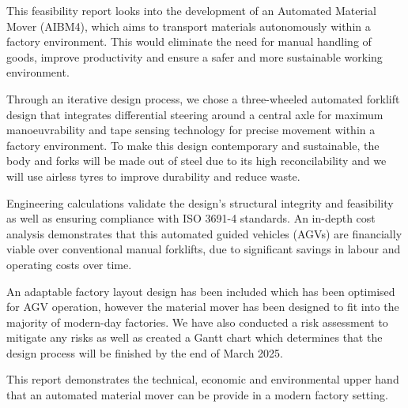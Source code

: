 \documentclass[12pt,titlepage]{article}
\begin{document}
This feasibility report looks into the development of an Automated Material Mover (AIBM4), which aims to transport materials autonomously within a factory environment. This would eliminate the need for manual handling of goods, improve productivity and ensure a safer and more sustainable working environment. 
\par Through an iterative design process, we chose a three-wheeled automated forklift design that integrates differential steering around a central axle for maximum manoeuvrability and tape sensing technology for precise movement within a factory environment. To make this design contemporary and sustainable, the body and forks will be made out of steel due to its high reconcilability and we will use airless tyres to improve durability and reduce waste.
\par Engineering calculations validate the design's structural integrity and feasibility as well as ensuring compliance with ISO 3691-4  standards. An in-depth cost analysis demonstrates that this automated guided vehicles (AGVs) are financially viable over conventional manual forklifts, due to significant savings in labour and operating costs over time. 
\par An adaptable factory layout design has been included which has been optimised for AGV operation, however the material mover has been designed to fit into the majority of modern-day factories. We have also conducted a risk assessment to mitigate any risks as well as created a Gantt chart which determines that the design process will be finished by the end of March 2025.
\par This report demonstrates the technical, economic and environmental upper hand that an automated material mover can be provide in a modern factory setting.

\vspace{2em}

\tableofcontents



\end{document}
